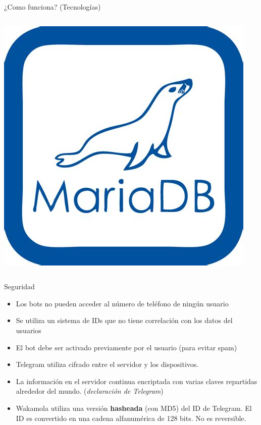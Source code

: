 \documentclass[bigger]{beamer}
\begin{document}
\begin{frame} {¿Como funciona? (Tecnologías)}
\begin{columns}[T]
\begin{column}[T]{6cm}
			\includegraphics[scale=0.2]{img/mariadb}
		\end{column}
	\end{columns}
\end{frame}

\begin{frame}{Seguridad}
	\begin{itemize}
		\item Los bots no pueden acceder al número de teléfono de ningún usuario
		\item Se utiliza un sistema de IDs que no tiene correlación con los datos del usuarios
		\item El bot debe ser activado previamente por el usuario (para evitar spam)
		\item Telegram utiliza cifrado entre el servidor y los dispositivos.
		\item La información en el servidor continua encriptada con varias claves repartidas alrededor del mundo. (\textit{declaración de Telegram})
		\item Wakamola utiliza una versión \textbf{hasheada} (con MD5) del ID de Telegram. El ID es convertido en una cadena alfanumérica de 128 bits. No es reversible.
	\end{itemize}
\end{frame}
\end{document}
